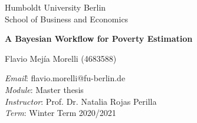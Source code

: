 \thispagestyle{empty}

\begin{center}

\vspace*{19mm}

{\LARGE Humboldt University Berlin}\\
{\LARGE School of Business and Economics\\}



\vspace*{4cm}



\vspace{1cm}

{\Large\textbf{A Bayesian Workflow for Poverty Estimation}}\\ [2mm]

\vspace*{1mm}

\vspace{2.5cm}

{\Large Flavio Mejía Morelli (4683588)}\\[3mm]



\vspace{2cm}
\parbox{120mm}{
\begin{large}
\begin{tabbing}

\textit{Email}:\= \hspace{0.5cm} flavio.morelli@fu-berlin.de\\
\textit{Module}:\> \hspace{0.5cm} Master thesis\\
\textit{Instructor}:\> \hspace{1 cm} Prof. Dr. Natalia Rojas Perilla\\
\textit{Term}:\> Winter Term 2020/2021\\

\end{tabbing}


\end{large}}
\end{center}
